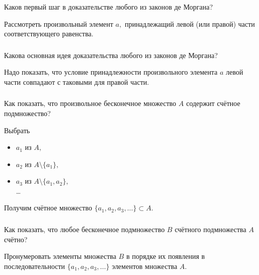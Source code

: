 \documentclass[11pt, a5paper]{article}
\newenvironment{note}[1]{\subsubsection{}}{}
\newenvironment{cloze}[2][\ldots]{\begin{leftbar}}{\end{leftbar}}
\begin{document}
    \begin{note}{61211f8d77d34c9fa47e8872540de683}
        Каков первый шаг в доказательстве любого из законов де Моргана?

        \begin{cloze}{1}
            Рассмотреть произвольный элемент \( a, \) принадлежащий левой (или
            правой) части соответствующего равенства.
        \end{cloze}
    \end{note}


    \begin{note}{7e46fe30f7624833823e79c0fedc16df}
        Какова основная идея доказательства любого из законов де Моргана?

        \begin{cloze}{1}
            Надо показать, что условие принадлежности произвольного элемента \( a \)
            левой части совпадают с таковыми для правой части.
        \end{cloze}
    \end{note}

    \begin{note}{010c7f55d37742fea697ee54e1b20715}
        Как показать, что произвольное бесконечное множество \( A \) содержит
        счётное подмножество?

        \begin{cloze}{1}
            Выбрать
            \begin{itemize}
                \item \( a_1 \) из \( A, \)
                \item \( a_2 \) из \( A \setminus \{ a_1 \}, \)
                \item \( a_3 \) из \( A \setminus \{ a_1, a_2 \}, \) \\
                    \dots
            \end{itemize}
            Получим счётное множество \( \{ a_1, a_2, a_3, \ldots \} \subset A.
            \)
        \end{cloze}
    \end{note}

    \begin{note}{61cad32098d341eb8086313887d6cd8c}
        Как показать, что любое бесконечное подмножество \( B \) счётного
        подмножества \( A \) счётно?

        \begin{cloze}{1}
            Пронумеровать элементы множества \( B \) в порядке их появления в
            последовательности \( \{ a_1, a_2, a_3, \ldots  \} \) элементов
            множества \( A. \)
        \end{cloze}
    \end{note}
\end{document}
